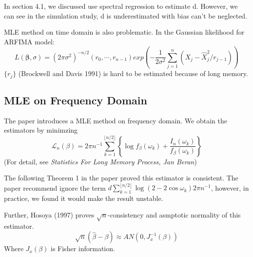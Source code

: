 \documentclass[10pt,a4paper]{article}
\begin{document}
In section 4.1, we discussed use spectral regression to estimate d. However, we can see in the simulation study, d is underestimated with bias can't be neglected.

MLE method on time domain is also problematic. In the Gaussian likelihood for ARFIMA model:\[
L(\bm{\beta},\sigma)=(2\pi\sigma^2)^{-n/2}(r_0,\cdots,r_{n-1})exp(-\frac{1}{2\sigma^2}\sum_{j=1}^{n}(X_j-\hat{X}_j^2/r_{j-1}))
\] 
$\{r_j\}$ (Brockwell and Davis 1991\cite{series1997springer}) is hard to be estimated because of long memory.
\subsection{MLE on Frequency Domain}
The paper introduces a MLE method on frequency domain. We obtain the estimators by minimzing $$\mathcal{L}_n(\beta)=2\pi n^{-1} \sum_{k=1}^{\lfloor n/2\rfloor} \left\{ \log f_\beta (\omega_k)+\frac{I_n(\omega_k)}{f_\beta (\omega_k)}\right\} $$
(For detail, see \emph{Statistics For Long Memory Process, Jan Beran})

The following Theorem 1 in the paper proved this estimator is consistent. The paper recommend ignore the term $d\sum_{k=1}^{\lfloor n/2\rfloor}\log(2-2\cos\omega_k)2\pi n^{-1}$, however, in practice, we found it would make the result unstable.

Further, Hosoya (1997)\cite{hosoya1997limit} proves $\sqrt{n}$-consistency and asmptotic normality of this estimator. \[
\sqrt{n}(\hat{\beta}-\beta)\approx AN(0,J_x^{-1}(\beta))
\]
Where $J_x(\beta)$ is Fisher information.
\end{document}
